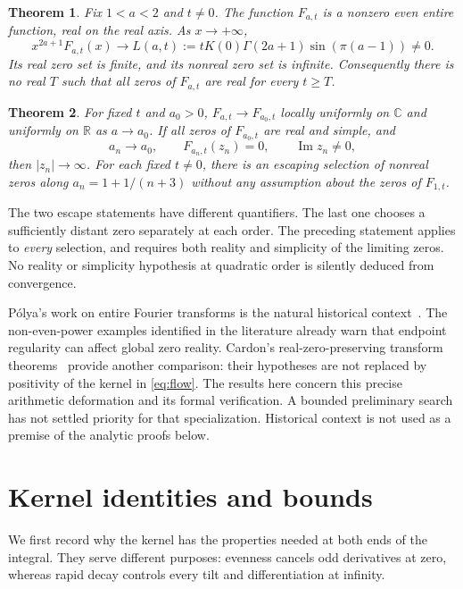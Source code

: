 \documentclass[11pt]{article}
\newtheorem{theorem}{Theorem}[section]
\theoremstyle{remark}\newtheorem{remark}[theorem]{Remark}
\newcommand{\R}{\mathbb R}\newcommand{\C}{\mathbb C}
\begin{document}
\begin{theorem}\label{thm:main}
Fix $1<a<2$ and $t\neq0$. The function $F_{a,t}$ is a nonzero even
entire function, real on the real axis. As $x\to+\infty$,
\begin{equation}\label{eq:asymptotic}
 x^{2a+1}F_{a,t}(x)\longrightarrow
 L(a,t):=tK(0)\Gamma(2a+1)\sin(\pi(a-1))\neq0.
\end{equation}
Its real zero set is finite, and its nonreal zero set is infinite.
Consequently there is no real $T$ such that all zeros of $F_{a,t}$
are real for every $t\geq T$.
\end{theorem}

\begin{theorem}\label{thm:limit}
For fixed $t$ and $a_0>0$, $F_{a,t}\to F_{a_0,t}$ locally uniformly
on $\C$ and uniformly on $\R$ as $a\to a_0$. If all zeros of
$F_{a_0,t}$ are real and simple, and
\[
 a_n\to a_0,\qquad F_{a_n,t}(z_n)=0,\qquad \operatorname{Im}z_n\neq0,
\]
then $|z_n|\to\infty$.
For each fixed $t\neq0$, there is an escaping selection of nonreal
zeros along $a_n=1+1/(n+3)$ without any assumption about the zeros
of $F_{1,t}$.
\end{theorem}

The two escape statements have different quantifiers. The last one
chooses a sufficiently distant zero separately at each order.
The preceding statement applies to \emph{every} selection, and
requires both reality and simplicity of the limiting zeros. No
reality or simplicity hypothesis at quadratic order is silently
deduced from convergence.

P\'olya's work on entire Fourier transforms is the natural historical
context~\cite{polya}. The non-even-power examples identified in the
literature already warn that endpoint regularity can affect global
zero reality. Cardon's real-zero-preserving transform
theorems~\cite{cardon} provide another comparison: their hypotheses
are not replaced by positivity of the kernel in \eqref{eq:flow}.
The results here concern this precise arithmetic deformation and its
formal verification. A bounded preliminary search has not settled
priority for that specialization. Historical context is not used as
a premise of the analytic proofs below.

\section{Kernel identities and bounds}
We first record why the kernel has the properties needed at both
ends of the integral. They serve different purposes: evenness cancels
odd derivatives at zero, whereas rapid decay controls every tilt
and differentiation at infinity.
\end{document}
